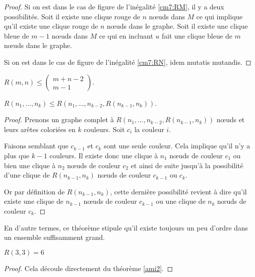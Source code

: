 \begin{mytheo} 
\begin{proof}
Si on est dans le cas de figure de l'inégalité \ref{cm7:RM}, il y a deux possibilités.
Soit il existe une clique rouge de $n$ nœuds dans $M$ ce qui implique qu'il existe une clique rouge de $n$ nœuds dans le graphe.
Soit il existe une clique bleue de $m-1$ nœuds dans $M$ ce qui en incluant $u$ fait une clique bleue de $m$ nœuds dans le graphe.

Si on est dans le cas de figure de l'inégalité \ref{cm7:RN}, idem mutatis mutandis.
  \end{proof}
\end{mytheo}

\begin{mycorr}
  $R(m,n) \leq \begin{pmatrix}
m+n-2\\
m-1
\end{pmatrix}$.
\end{mycorr}

\begin{mytheo}
  \label{theo:kkp1}
$R(n_1,...,n_k) \leq R \left( n_1,...,n_{k-2},R(n_{k-1},n_k) \right)$.

\begin{proof}
  Prenons un graphe complet à $R(n_1, ..., n_{k-2}, R(n_{k-1}, n_k))$ nœuds et leurs arêtes coloriées en $k$ couleurs. Soit $c_i $ la couleur $i$.

  Faisons semblant que $c_{k-1}$ et $c_{k}$ sont une seule couleur.
  Cela implique qu'il n'y a plus que $k-1$ couleurs.
  Il existe donc une clique à $n_1$ nœuds de couleur $c_1$ ou bien une clique à $n_2$ nœuds de couleur $c_2$ et ainsi de suite jusqu'à la possibilité d'une clique de $R(n_{k-1}, n_k)$ nœuds de couleur $c_{k-1}$ ou $c_{k}$.

  Or par définition de $R(n_{k-1}, n_k)$, cette dernière possibilité revient à dire qu'il existe une clique de $n_{k-1}$ nœuds de couleur $c_{k-1}$ ou une clique de $n_{k}$ nœuds de couleur $c_{k}$.
\end{proof}
\end{mytheo}

\vspace{0.3cm}
En d'autre termes, ce théorème stipule qu'il existe toujours un peu d'ordre dans un ensemble suffisamment grand.

\begin{mytheo} 
  $R(3, 3) = 6$
  \begin{proof}
     Cela découle directement du théorème \ref{ami2}.
  \end{proof}
\end{mytheo}


